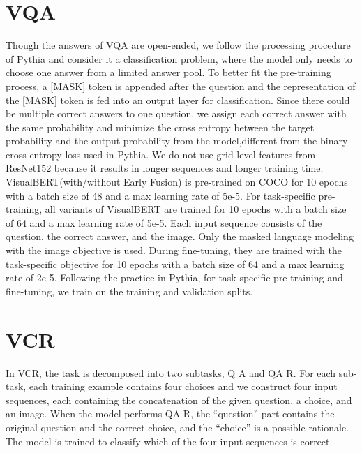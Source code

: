 \documentclass{article} \usepackage{iclr2019_conference,times}
\newcommand{\model}{VisualBERT\xspace}
\begin{document}
\section{VQA}\label{appendix:vqa}
Though the answers of VQA are open-ended, we follow the processing procedure of Pythia and consider it a classification problem, where the model only needs to choose one answer from a limited answer pool.
To better fit the pre-training process, a [MASK] token is appended after the question and the representation of the [MASK] token is fed into an output layer for classification.
Since there could be multiple correct answers to one question, we assign each correct answer with the same probability and minimize the cross entropy between the target probability and the output probability from the model,different from the binary cross entropy loss used in Pythia.
We do not use grid-level features from ResNet152 because it results in longer sequences and longer training time. 
\model (with/without Early Fusion) is pre-trained on COCO for 10 epochs with a batch size of 48 and a max learning rate of 5e-5.
For task-specific pre-training, all variants of \model are trained for 10 epochs with a batch size of 64 and a max learning rate of 5e-5.
Each input sequence consists of the question, the correct answer, and the image.
Only the masked language modeling with the image objective is used. 
During fine-tuning, they are trained with the task-specific objective for 10 epochs with a batch size of 64 and a max learning rate of 2e-5.
Following the practice in Pythia, for task-specific pre-training and fine-tuning, we train on the training and validation splits.

\section{VCR}\label{appendix:vcr}
In VCR, the task is decomposed into two subtasks, Q  A and QA  R.
For each sub-task, each training example contains four choices and we construct four input sequences, each containing the concatenation of the given question, a choice, and an image. When the model performs QA  R, the ``question'' part contains the original question and the correct choice, and the ``choice'' is a possible rationale.
The model is trained to classify which of the four input sequences is correct.
\end{document}
